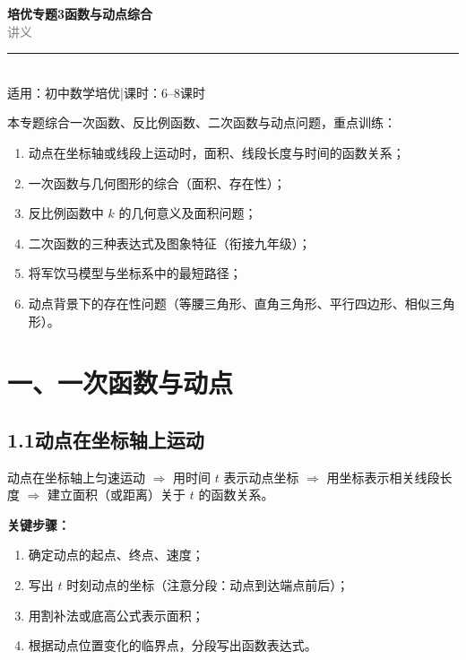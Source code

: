\documentclass[12pt, a4paper]{ctexart}
\begin{document}
\begin{center}
{\Huge\bfseries\textcolor{mainblue}{培优专题3\quad 函数与动点综合}}\\[12pt]
{\Large\textcolor{gray}{讲\quad 义}}\\[8pt]
\rule{0.6\textwidth}{1pt}\\[8pt]
{\normalsize 适用：初中数学培优\quad |\quad 课时：6--8课时}
\end{center}
\vspace{10pt}

\begin{knowledgebox}[知识框架]
本专题综合一次函数、反比例函数、二次函数与动点问题，重点训练：
\begin{enumerate}[label=\textcolor{mainblue}{\arabic*.}]
  \item 动点在坐标轴或线段上运动时，面积、线段长度与时间的函数关系；
  \item 一次函数与几何图形的综合（面积、存在性）；
  \item 反比例函数中 $k$ 的几何意义及面积问题；
  \item 二次函数的三种表达式及图象特征（衔接九年级）；
  \item 将军饮马模型与坐标系中的最短路径；
  \item 动点背景下的存在性问题（等腰三角形、直角三角形、平行四边形、相似三角形）。
\end{enumerate}
\end{knowledgebox}

\vspace{6pt}

\section*{\textcolor{mainblue}{一、一次函数与动点}}

\subsection*{1.1\quad 动点在坐标轴上运动}

\begin{knowledgebox}[核心思路]
动点在坐标轴上匀速运动 $\Rightarrow$ 用时间 $t$ 表示动点坐标 $\Rightarrow$ 用坐标表示相关线段长度 $\Rightarrow$ 建立面积（或距离）关于 $t$ 的函数关系。

\medskip
\textbf{关键步骤：}
\begin{enumerate}[label=(\arabic*)]
  \item 确定动点的起点、终点、速度；
  \item 写出 $t$ 时刻动点的坐标（注意分段：动点到达端点前后）；
  \item 用割补法或底高公式表示面积；
  \item 根据动点位置变化的临界点，分段写出函数表达式。
\end{enumerate}
\end{knowledgebox}
\end{document}
